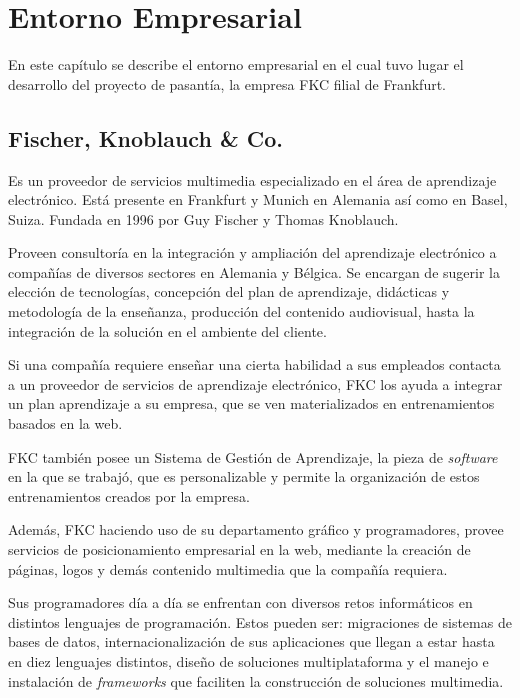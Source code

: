 \chapter{Entorno Empresarial}
\thispagestyle{empty} %

En este capítulo se describe el entorno empresarial en el cual tuvo lugar el desarrollo del proyecto de pasantía, la empresa \gls{FKC} filial de Frankfurt.

\section{Fischer, Knoblauch \& Co.}

Es un proveedor de servicios multimedia especializado en el área de aprendizaje electrónico. Está presente en Frankfurt y Munich en Alemania así como en Basel, Suiza. Fundada en 1996 por Guy Fischer y Thomas Knoblauch.

Proveen consultoría en la integración y ampliación del aprendizaje electrónico a compañías de diversos sectores en Alemania y Bélgica. Se encargan de sugerir la elección de tecnologías, concepción del plan de aprendizaje, didácticas y metodología de la enseñanza, producción del contenido audiovisual, hasta la integración de la solución en el ambiente del cliente. 

Si una compañía requiere enseñar una cierta habilidad a sus empleados contacta a un proveedor de servicios de aprendizaje electrónico, \gls{FKC} los ayuda a integrar un plan aprendizaje a su empresa, que se ven materializados en entrenamientos basados en la web. 

\gls{FKC} también posee un Sistema de Gestión de Aprendizaje, la pieza de \emph{software} en la que se trabajó, que es personalizable y permite la organización de estos entrenamientos creados por la empresa.

Además, \gls{FKC} haciendo uso de su departamento gráfico y programadores, provee servicios de posicionamiento empresarial en la web, mediante la creación de páginas, logos y demás contenido multimedia que la compañía requiera. 

Sus programadores día a día se enfrentan con diversos retos informáticos en distintos lenguajes de programación. Estos pueden ser: migraciones de sistemas de bases de datos, internacionalización de sus aplicaciones que llegan a estar hasta en diez lenguajes distintos, diseño de soluciones multiplataforma y el manejo e instalación de \emph{frameworks} que faciliten la construcción de soluciones multimedia.

